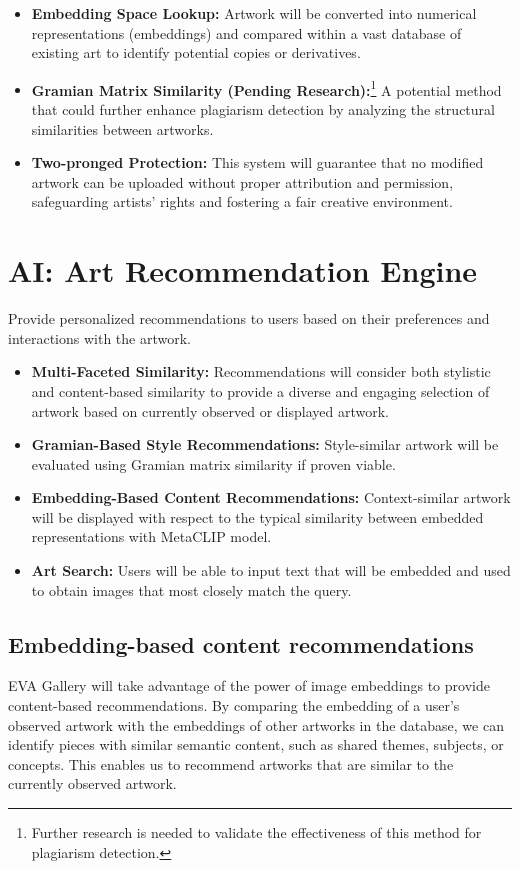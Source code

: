     \begin{itemize}
        \item \textbf{Embedding Space Lookup:} Artwork will be converted into numerical representations (embeddings) and compared within a vast database of existing art to identify potential copies or derivatives.
        \item \textbf{Gramian Matrix Similarity (Pending Research):}\footnote{Further research is needed to validate the effectiveness of this method for plagiarism detection.} A potential method that could further enhance plagiarism detection by analyzing the structural similarities between artworks.
        \item \textbf{Two-pronged Protection:} This system will guarantee that no modified artwork can be uploaded without proper attribution and permission, safeguarding artists' rights and fostering a fair creative environment.
    \end{itemize}

\newpage

\section{AI: Art Recommendation Engine}
Provide personalized recommendations to users based on their preferences and interactions with the artwork.

\begin{itemize}
    \item \textbf{Multi-Faceted Similarity:} Recommendations will consider both stylistic and content-based similarity to provide a diverse and engaging selection of artwork based on currently observed or displayed artwork.
    \item \textbf{Gramian-Based Style Recommendations:} Style-similar artwork will be evaluated using Gramian matrix similarity if proven viable.
    \item \textbf{Embedding-Based Content Recommendations:} Context-similar artwork will be displayed with respect to the typical similarity between embedded representations with MetaCLIP model.
    \item \textbf{Art Search:} Users will be able to input text that will be embedded and used to obtain images that most closely match the query.
\end{itemize}

\subsection{Embedding-based content recommendations}
EVA Gallery will take advantage of the power of image embeddings to provide content-based recommendations. By comparing the embedding of a user's observed artwork with the embeddings of other artworks in the database, we can identify pieces with similar semantic content, such as shared themes, subjects, or concepts. This enables us to recommend artworks that are similar to the currently observed artwork.

